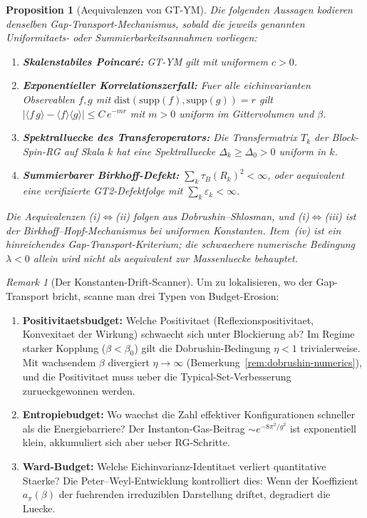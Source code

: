 \documentclass[12pt,a4paper]{article}
\theoremstyle{definition}
\theoremstyle{plain}
\newtheorem{proposition}[definition]{Proposition}
\theoremstyle{remark}
\newtheorem{remark}[definition]{Remark}
\begin{document}
\begin{proposition}[Aequivalenzen von GT-YM]\label{prop:gt-equivalences}
Die folgenden Aussagen kodieren denselben Gap-Transport-Mechanismus, sobald die jeweils genannten Uniformitaets- oder Summierbarkeitsannahmen vorliegen:
\begin{enumerate}
\item[(i)] \textbf{Skalenstabiles Poincar\'e:} GT-YM gilt mit uniformem $c > 0$.
\item[(ii)] \textbf{Exponentieller Korrelationszerfall:} Fuer alle eichinvarianten Observablen $f, g$ mit $\mathrm{dist}(\mathrm{supp}(f), \mathrm{supp}(g)) = r$ gilt
  $|\langle f\, g \rangle - \langle f \rangle \langle g \rangle| \leq C\, e^{-m r}$
  mit $m > 0$ uniform im Gittervolumen und $\beta$.
\item[(iii)] \textbf{Spektralluecke des Transferoperators:} Die Transfermatrix $T_k$ der Block-Spin-RG auf Skala $k$ hat eine Spektralluecke $\Delta_k \geq \Delta_0 > 0$ uniform in $k$.
\item[(iv)] \textbf{Summierbarer Birkhoff-Defekt:} $\sum_k \tau_B(R_k)^2 < \infty$, oder aequivalent eine verifizierte GT2-Defektfolge mit $\sum_k\varepsilon_k<\infty$.
\end{enumerate}
Die Aequivalenzen (i)$\Leftrightarrow$(ii) folgen aus Dobrushin--Shlosman, und (i)$\Leftrightarrow$(iii) ist der Birkhoff--Hopf-Mechanismus bei uniformen Konstanten. Item~(iv) ist ein hinreichendes Gap-Transport-Kriterium; die schwaechere numerische Bedingung $\lambda<0$ allein wird nicht als aequivalent zur Massenluecke behauptet.
\end{proposition}

\begin{remark}[Der Konstanten-Drift-Scanner]\label{rem:drift-scanner}
Um zu lokalisieren, wo der Gap-Transport bricht, scanne man drei Typen von Budget-Erosion:
\begin{enumerate}
\item \textbf{Positivitaetsbudget:} Welche Positivitaet (Reflexionspositivitaet, Konvexitaet der Wirkung) schwaecht sich unter Blockierung ab? Im Regime starker Kopplung ($\beta < \beta_0$) gilt die Dobrushin-Bedingung $\eta < 1$ trivialerweise. Mit wachsendem $\beta$ divergiert $\eta \to \infty$ (Bemerkung~\ref{rem:dobrushin-numerics}), und die Positivitaet muss ueber die Typical-Set-Verbesserung zurueckgewonnen werden.
\item \textbf{Entropiebudget:} Wo waechst die Zahl effektiver Konfigurationen schneller als die Energiebarriere? Der Instanton-Gas-Beitrag $\sim e^{-8\pi^2/g^2}$ ist exponentiell klein, akkumuliert sich aber ueber RG-Schritte.
\item \textbf{Ward-Budget:} Welche Eichinvarianz-Identitaet verliert quantitative Staerke? Die Peter--Weyl-Entwicklung kontrolliert dies: Wenn der Koeffizient $a_\pi(\beta)$ der fuehrenden irreduziblen Darstellung driftet, degradiert die Luecke.
\end{enumerate}
\end{remark}
\end{document}
